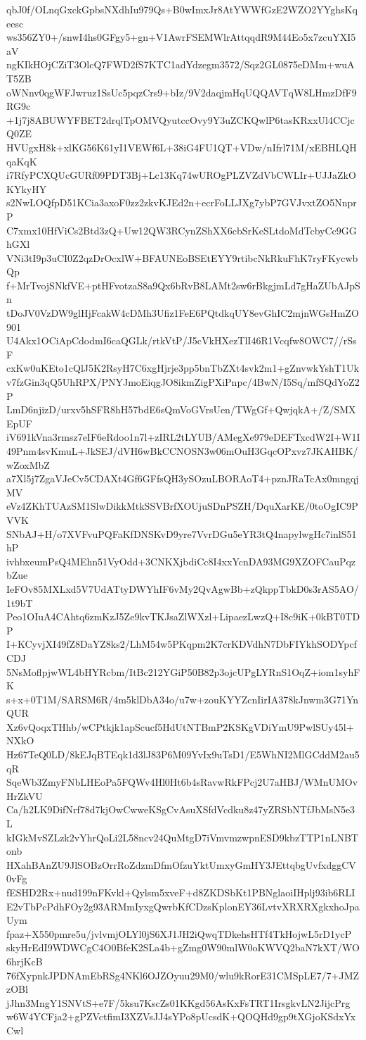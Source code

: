 qbJ0f/OLnqGxckGpbsNXdhIu979Qs+B0wImxJr8AtYWWfGzE2WZO2YYghsKqeesc
ws356ZY0+/snwI4hs0GFgy5+gn+V1AwrFSEMWlrAttqqdR9M44Eo5x7zcuYXI5aV
ngKIkHOjCZiT3OlcQ7FWD2fS7KTC1adYdzegm3572/Sqz2GL0875eDMm+wuAT5ZB
oWNnv0qgWFJwruz1SsUc5pqzCrs9+bIz/9V2daqjmHqUQQAVTqW8LHmzDfF9RG9c
+1j7j8ABUWYFBET2drqlTpOMVQyutccOvy9Y3uZCKQwlP6tasKRxxUl4CCjcQ0ZE
HVUgxH8k+xlKG56K61yI1VEWf6L+38iG4FU1QT+VDw/nIfrl71M/xEBHLQHqaKqK
i7RfyPCXQUcGURf09PDT3Bj+Lc13Kq74wUROgPLZVZdVbCWLIr+UJJaZkOKYkyHY
s2NwLOQfpD51KCia3axoF0zz2zkvKJEd2n+ecrFoLLJXg7ybP7GVJvxtZO5NnprP
C7xmx10HfViCs2Btd3zQ+Uw12QW3RCynZShXX6cbSrKeSLtdoMdTcbyCc9GGhGXl
VNi3tI9p3uCI0Z2qzDrOcxlW+BFAUNEoBSEtEYY9rtibcNkRkuFhK7ryFKycwbQp
f+MrTvojSNkfVE+ptHFvotzaS8a9Qx6bRvB8LAMt2sw6rBkgjmLd7gHaZUbAJpSn
tDoJV0VzDW9glHjFcakW4cDMh3Ufiz1FeE6PQtdkqUY8evGhIC2mjnWGsHmZO901
U4Akx1OCiApCdodmI6caQGLk/rtkVtP/J5cVkHXezTlI46R1Vcqfw8OWC7//rSsF
cxKw0uKEto1cQlJ5K2RsyH7C6xgHjrje3pp5bnTbZXt4svk2m1+gZnvwkYshT1Uk
v7fzGin3qQ5UhRPX/PNYJmoEiqgJO8ikmZigPXiPnpc/4BwN/I5Sq/mfSQdYoZ2P
LmD6njizD/urxv5hSFR8hH57bdE6sQmVoGVrsUen/TWgGf+QwjqkA+/Z/SMXEpUF
iV691kVna3rmsz7eIF6eRdoo1n7l+zIRL2tLYUB/AMegXe979eDEFTxcdW2I+W1I
49Pnm4svKmuL+JkSEJ/dVH6wBkCCNOSN3w06mOuH3GqcOPxvz7JKAHBK/wZoxMbZ
a7Xl5j7ZgaVJeCv5CDAXt4Gf6GFfsQH3ySOzuLBORAoT4+pznJRaTcAx0mngqjMV
eVz4ZKhTUAzSM1SlwDikkMtkSSVBrfXOUjuSDnPSZH/DquXarKE/0toOgIC9PVVK
SNbAJ+H/o7XVFvuPQFaKfDNSKvD9yre7VvrDGu5eYR3tQ4napylwgHc7inlS51hP
ivhbxeumPsQ4MEhn51VyOdd+3CNKXjbdiCc8I4xxYcnDA93MG9XZOFCauPqzbZue
IeFOv85MXLxd5V7UdATtyDWYhIF6vMy2QvAgwBb+zQkppTbkD0s3rAS5AO/1t9bT
Peo1OIuA4CAhtq6zmKzJ5Ze9kvTKJsaZlWXzl+LipaezLwzQ+I8c9iK+0kBT0TDP
I+KCyvjXI49fZ8DaYZ8ks2/LhM54w5PKqpm2K7crKDVdhN7DbFIYkhSODYpcfCDJ
5NsMoflpjwWL4bHYRcbm/ItBc212YGiP50B82p3ojcUPgLYRnS1OqZ+iom1syhFK
s+x+0T1M/SARSM6R/4m5klDbA34o/u7w+zouKYYZcnIirIA378kJnwm3G71YnQUR
Xz6vQoqxTHhb/wCPtkjk1apScucf5HdUtNTBmP2KSKgVDiYmU9PwlSUy45l+NXkO
Hz67TeQ0LD/8kEJqBTEqk1d3lJ83P6M09YvIx9uTsD1/E5WhNI2MlGCddM2au5qR
SqeWb3ZmyFNbLHEoPa5FQWv4Hl0Ht6b4sRavwRkFPcj2U7aHBJ/WMnUMOvHrZkVU
Ca/h2LK9DifNrf78d7kjOwCwweKSgCvAsuXSfdVcdku8z47yZRSbNTfJbMsN5e3L
kIGkMvSZLzk2vYhrQoLi2L58ncv24QuMtgD7iVmvmzwpnESD9kbzTTP1nLNBTonb
HXahBAnZU9JlSOBzOrrRoZdzmDfmOfzuYktUmxyGmHY3JEttqbgUvfxdggCV0vFg
fESHD2Rx+nud199nFKvkl+Qylsm5xveF+d8ZKDSbKt1PBNglaoiIHplj93ib6RLI
E2vTbPcPdhFOy2g93ARMmIyxgQwrbKfCDzsKplonEY36LvtvXRXRXgkxhoJpaUym
fpaz+X550pmre5u/jvlvmjOLYl0jS6XJ1JH2iQwqTDkehsHTf4TkHojwL5rD1ycP
skyHrEdI9WDWCgC4O0BfeK2SLa4b+gZmg0W90mlW0oKWVQ2baN7kXT/WO6hrjKcB
76fXypnkJPDNAmEbRSg4NKl6OJZOyuu29M0/wlu9kRorE31CMSpLE7/7+JMZzOBl
jJhn3MngY1SNVtS+e7F/5ksu7KscZs01KKgd56AsKxFsTRT1IrsgkvLN2JijcPrg
w6W4YCFja2+gPZVctfimI3XZVsJJ4sYPo8pUcsdK+QOQHd9gp9tXGjoKSdxYxCwl
